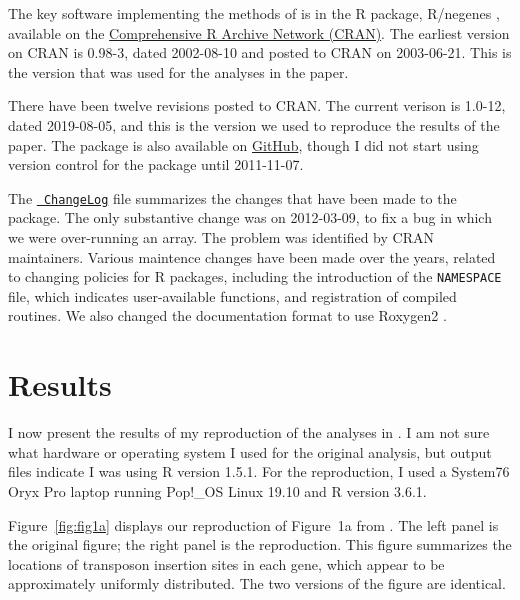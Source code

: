 The key software implementing the methods of \citet{lamichhane2003}
is in the R package, R/negenes \citep{negenes}, available on the
\href{https://cran.r-project.org/package=negenes}{Comprehensive R
Archive Network (CRAN)}. The earliest version on CRAN is 0.98-3, dated
2002-08-10 and posted to CRAN on 2003-06-21. This is the version that
was used for the analyses in the paper.

There have been twelve revisions posted to CRAN. The current verison
is 1.0-12, dated 2019-08-05, and this is the version we used to
reproduce the results of the paper. The package is also available on
\href{https://github.com/kbroman/negenes}{GitHub}, though I did not
start using version control for the package until 2011-11-07.

The \href{https://github.com/kbroman/negenes/blob/master/ChangeLog}{\tt
ChangeLog} file summarizes the changes that have been made to the
package. The only substantive change was on 2012-03-09, to fix a bug
in which we were over-running an array. The problem was identified by
CRAN maintainers. Various maintence changes have been made over the
years, related to changing policies for R packages, including the
introduction of the {\tt NAMESPACE} file, which indicates
user-available functions, and registration of compiled routines. We
also changed the documentation format to use
Roxygen2 \citep{roxygen2}.


\section{Results}

I now present the results of my reproduction of the analyses
in \citet{lamichhane2003}. I am not sure what hardware or operating
system I used for the original analysis, but output files indicate I
was using R version 1.5.1. For the reproduction, I used a System76
Oryx Pro laptop running Pop!\_OS Linux 19.10 and R version 3.6.1.

Figure~\ref{fig:fig1a} displays our
reproduction of Figure~1a from \citet{lamichhane2003}. The left panel
is the original figure; the right panel is the reproduction. This
figure summarizes the locations of transposon insertion sites in each
gene, which appear to be approximately uniformly distributed. The two
versions of the figure are identical.

